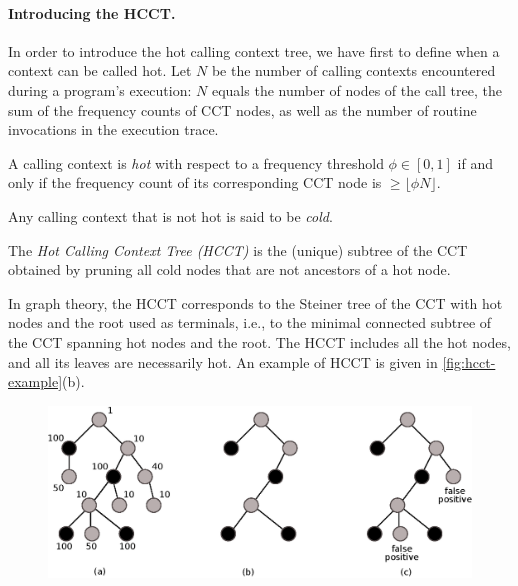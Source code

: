 \paragraph*{Introducing the HCCT.} In order to introduce the hot calling context tree, we have first to define when a context can be called hot. Let $N$ be the number of calling contexts encountered during a program's execution: $N$ equals the number of nodes of the call tree, the sum of the frequency counts of CCT nodes, as well as the number of routine invocations in the execution trace. 

\begin{definition}
A calling context is {\em hot} with respect to a frequency threshold $\phi\in[0,1]$ if and only if the frequency count of its corresponding CCT node is $\geq \lfloor\phi N\rfloor$. 
\end{definition}

\noindent Any calling context that is not hot is said to be {\em cold}. 

\begin{definition}
The {\em Hot Calling Context Tree (HCCT)} is the (unique) subtree of the CCT obtained by pruning all cold nodes that are not ancestors of a hot node.
\end{definition}

\noindent In graph theory, the HCCT corresponds to the Steiner tree of the CCT with hot nodes and the root used as terminals, i.e., to the minimal connected subtree of the CCT spanning hot nodes and the root. The HCCT includes all the hot nodes, and all its leaves are necessarily hot. An example of HCCT is given in \myfigure\ref{fig:hcct-example}(b). 

\ifdefined\noauthorea
\begin{figure}[ht]
\begin{center}
\includegraphics[width=0.95\columnwidth]{figures/hcct-example/hcct-example.eps}
\caption{\protect}
\end{center}
\end{figure}
\fi

